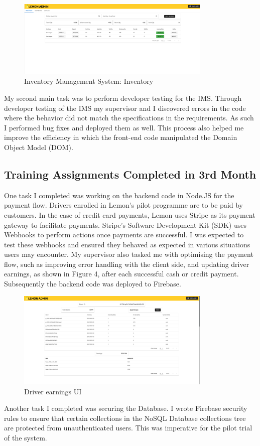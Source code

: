 \begin{figure}[h!]
	\begin{center}
		\includegraphics[width=350px]{assets/images/lemon-inventory.png}
		\caption{Inventory Management System: Inventory}
		\label{fig:lemon-inventory}
	\end{center}
\end{figure}

\noindent
My second main task was to perform developer testing for the IMS. Through developer testing of the IMS my supervisor and I discovered errors in the code where the behavior did not match the specifications in the requirements.
As such I performed bug fixes and deployed them as well. This process also helped me improve the efficiency in which the front-end
code manipulated the Domain Object Model (DOM).

\subsection{Training Assignments Completed in 3rd Month}
\noindent
One task I completed was working on the backend code in Node.JS for the payment flow. Drivers enrolled in Lemon's pilot programme are to be paid by customers. In the case of 
credit card payments, Lemon uses Stripe \cite{REF3:1} as its payment gateway to facilitate payments. Stripe's Software Development Kit (SDK) uses Webhooks to perform actions
once payments are successful. I was expected to test these webhooks and ensured they behaved as expected in various situations users may encounter.
\noindent
My supervisor also tasked me with optimising the payment flow, such as improving error handling with the client side, and
updating driver earnings, as shown in Figure 4, after each successful cash or credit payment. Subsequently the backend code was deployed to Firebase.

\begin{figure}[h!]
	\begin{center}
		\includegraphics[width=350px]{assets/images/lemon-earnings.png}
		\caption{Driver earnings UI}
		\label{fig:lemon-earnings}
	\end{center}
\end{figure}

\noindent
Another task I completed was securing the Database. I wrote Firebase security rules to ensure that certain collections in the NoSQL Database collections tree are protected from unauthenticated users. This was imperative for the pilot trial of the system.